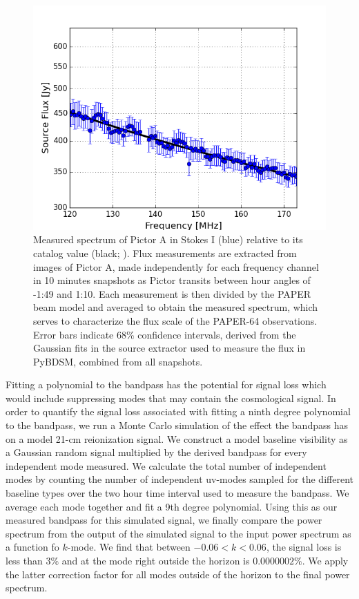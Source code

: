 \documentclass[twocolumn,numberedappendix]{emulateapj} \shorttitle{PSA64}
\begin{document}
\begin{figure}
\centering
\includegraphics[width=\columnwidth]{plots/picspec.png}
\caption{
Measured spectrum of Pictor A in Stokes I (blue) relative to its catalog
value (black; \citealt{jacobs_et_al2013}).  Flux measurements are
extracted from images of Pictor A, made independently for each frequency channel in
10 minutes snapshots as Pictor transits between hour angles of -1:49
and 1:10.  Each measurement is then divided by the PAPER beam model and
averaged to obtain the measured spectrum, which serves to characterize the flux
scale of the PAPER-64 observations. Error bars indicate 68\% confidence
intervals, derived from the Gaussian fits in the source extractor used to
measure the flux in PyBDSM, combined from all snapshots.
}\label{fig:pic_spec}
\end{figure}


Fitting a polynomial to the bandpass has the potential for signal loss which
would include suppressing modes that may contain the cosmological signal. In order to
quantify the signal loss associated with fitting a ninth degree polynomial to
the bandpass, we run a Monte Carlo simulation of the effect the bandpass has on
a model 21-cm reionization signal. We construct a model baseline visibility as a Gaussian
random signal 
multiplied by the derived bandpass for every independent mode measured. We
calculate the total number of independent modes by counting the number of
independent uv-modes sampled for the different baseline types over the two hour
time interval used to measure the bandpass. We average each mode together and
fit a 9th degree polynomial. Using this as our measured bandpass for this
simulated signal, we finally compare the power spectrum from the output of the
simulated signal to the input power spectrum as a function fo $k$-mode.  We
find that between $-0.06 < k < 0.06$, the signal loss is less than $3\%$ and at
the mode right outside the horizon is $0.0000002\%$. We apply the latter
correction factor for all modes outside of the horizon to the final power
spectrum.
\end{document}
